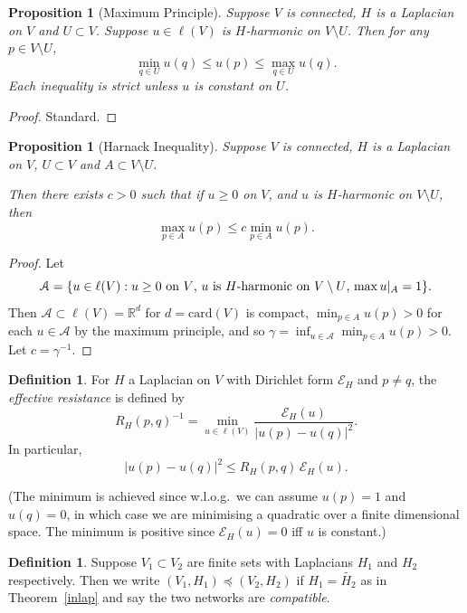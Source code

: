 \documentclass[a4paper]{amsart}
\theoremstyle{plain}
\newtheorem{proposition}[theorem]{Proposition}
\theoremstyle{definition}
\newtheorem{definition}[theorem]{Definition}%
\theoremstyle{remark}
\begin{document}
\begin{proposition}[Maximum Principle] Suppose  $ V $ is connected, $ H $ is a Laplacian on $ V $ and $ U \subset V $. Suppose $ u \in \ell(V) $ is $ H $-harmonic on $ V \setminus U $.  Then  for any $ p \in V \setminus U $,
\[
\min_{q \in U }u(q)  \leq u(p) \leq \max_{q \in U} u(q).
\]
Each inequality is strict unless $ u $ is constant on $ U $.
\end{proposition}           
           
 \begin{proof} Standard. \end{proof}
 
 
\begin{proposition}[Harnack Inequality]  Suppose $ V $ is connected, $ H $ is a Laplacian on $ V $,   $ U \subset V $ and $ A \subset V \setminus U $.

Then there exists $ c > 0 $ such that if $ u \geq 0 $ on $ V $, and $ u $ is $ H $-harmonic on   $ V \setminus   U    $,    then 
\[
\max_ {p\in A} u(p) \leq c \min _{p \in A} u(p).
\]
           \end{proposition}           
           
 \begin{proof}
 Let 
 \[
 \mathcal{A} = \{ u \in \ell(V) :   \text{$ u \geq 0 $ on $ V $, $ u $  is $ H $-harmonic on   $ V \setminus   U    $, $ \max u|_A = 1 $} \}.
 \]
Then $ \mathcal{A} \subset \ell(V) = \mathbb{R}^d  $ for $ d = \text{card} (V) $ is compact, $ \min _{p \in A} u(p)> 0 $ for each $ u \in \mathcal{A} $ by the maximum principle, and so $ \gamma = \inf _{u \in \mathcal{A} } \min _{p \in A} u(p) > 0 $.  Let $ c = \gamma ^{-1} $.
\end{proof} 

\begin{definition} \label{dflfc} For $ H $ a Laplacian on $ V $ with Dirichlet form $ \mathcal{E} _H $ and $ p \neq q $, the \emph{effective resistance} is defined by 
\[
R_H (p,q)^{-1} = \min_{u \in \ell(V)}  \frac{\mathcal{E}  _H(u) }{ \big|u(p) - u(q) \big|^2}.
\]
In particular,
\[
\big|u(p) - u(q) \big|^2 \leq R_H (p,q)\,  \mathcal{E}  _H(u) .
\]
\end{definition} 

(The minimum is achieved since w.l.o.g.\ we can assume $ u(p) = 1 $ and $ u(q) = 0 $, in which case we are minimising a quadratic over a finite dimensional space.  The minimum is positive since $ \mathcal{E} _H(u) = 0 $ iff $ u $ is constant.)


\begin{definition} Suppose $ V_1 \subset V_2 $ are finite sets with Laplacians $ H_1 $ and $ H_2 $ respectively.  Then we write $ (V_1,H_1) \preccurlyeq (V_2,H_2 ) $ if $ H_1 = \widetilde{H_2} $ as in Theorem~\ref{inlap} and say the two networks are \emph{compatible}.
\end{definition} 
\end{document}
